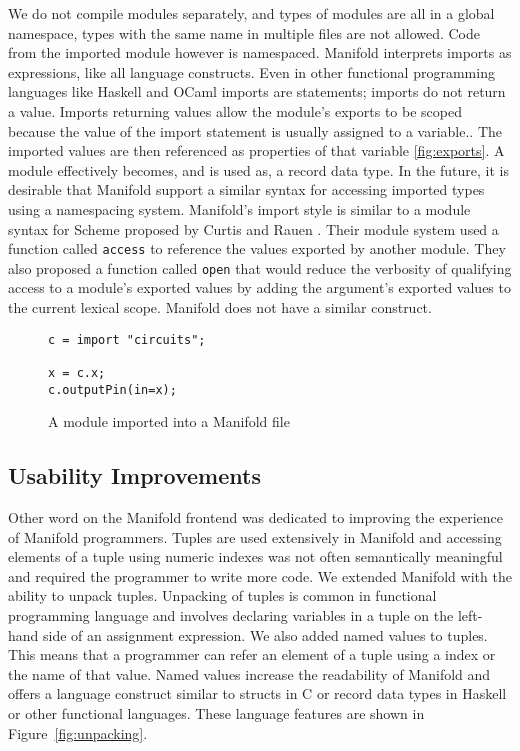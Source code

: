 We do not compile modules separately, and types of modules are all in a global namespace, types with the same name in multiple files are not allowed. Code from the imported module however is namespaced. Manifold interprets imports as expressions, like all language constructs. Even in other functional programming languages like Haskell and OCaml imports are statements; imports do not return a value.  Imports returning values allow the module's exports to be scoped because the value of the import statement is usually assigned to a variable.. The imported values are then referenced as properties of that variable \ref{fig:exports}. A module effectively becomes, and is used as, a record data type. In the future, it is desirable that Manifold support a similar syntax for accessing imported types using a namespacing system. Manifold's import style is similar to a module syntax for Scheme proposed by Curtis and Rauen \cite{Curtis:1990:MSS:91556.91573}. Their module system used a function called \texttt{access} to reference the values exported by another module. They also proposed a function called \texttt{open} that would reduce the verbosity of qualifying access to a module's exported values by adding the argument's exported values to the current lexical scope. Manifold does not have a similar construct.

\begin{figure}[!ht]
\label{fig:imports}
\caption{A module imported into a Manifold file}
\begin{lstlisting}
c = import "circuits";

x = c.x;
c.outputPin(in=x);
\end{lstlisting}
\end{figure}


\subsection{Usability Improvements}

Other word on the Manifold frontend was dedicated to improving the experience
of Manifold programmers. Tuples are used extensively in Manifold and accessing
elements of a tuple using numeric indexes was not often semantically meaningful
and required the programmer to write more code. We extended Manifold with the
ability to unpack tuples. Unpacking of tuples is common in functional
programming language and involves declaring variables in a tuple on the
left-hand side of an assignment expression. We also added named values to
tuples. This means that a programmer can refer an element of a tuple using a
index or the name of that value. Named values increase the readability of
Manifold and offers a language construct similar to structs in C or record data
types in Haskell or other functional languages. These language features are
shown in Figure~\ref{fig:unpacking}.

